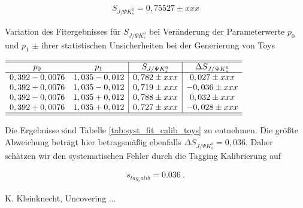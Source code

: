 \documentclass[a4paper]{scrbook}
\newcommand{\SJPsi}{S_{J/\Psi K_s^0}}
\begin{document}
\begin{align}
\SJPsi = 0,75527 \pm xxx
\end{align}

\begin{table}[hptb]
\centering
\caption{Variation des Fitergebnisses für $\SJPsi$ bei Veränderung der Parameterwerte $p_0$ und $p_1$ $\pm$ ihrer statistischen Unsicherheiten bei der Generierung von Toys}
\label{tab:syst_fit_calib_toys}
$\begin{array}{cc|c|c}
\hline\hline
p_0            & p_1           & \SJPsi          & \Delta\SJPsi   \\ \hline
0,392 - 0,0076 & 1,035 - 0,012 & 0,782 \pm xxx & 0,027 \pm xxx \\
0,392 + 0,0076 & 1,035 - 0,012 & 0,719 \pm xxx & -0,036 \pm xxx \\
0,392 - 0,0076 & 1,035 + 0,012 & 0,788 \pm xxx & 0,032 \pm xxx \\
0,392 + 0,0076 & 1,035 + 0,012 & 0,727 \pm xxx & -0,028 \pm xxx \\
\hline\hline
\end{array}$
\end{table}

Die Ergebnisse sind Tabelle \ref{tab:syst_fit_calib_toys} zu entnehmen. Die größte Abweichung beträgt hier betragsmäßig ebenfalls $\Delta\SJPsi = 0,036$. Daher schätzen wir den systematischen Fehler durch die Tagging Kalibrierung auf 

\begin{align}
s_{tag_calib} = 0.036 \ .
\end{align}

\begin{thebibliography}{---}
  K. Kleinknecht, Uncovering ...
\end{thebibliography}

\printglossaries 

\end{document}
